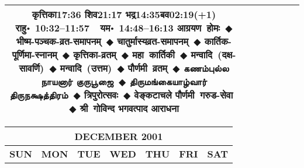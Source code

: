 \documentclass[a3paper,12pt,landscape]{article}
\newcommand{\eventsep}{~$\Diamondblack$ }
\newcommand{\To}{\hspace{1pt}\raisebox{0pt}{\tiny\RIGHTarrow}\hspace{1pt}}
\newcommand{\tamil}[1]{%
{\fontspec[Scale=0.9,FakeStretch=0.9]{Noto Sans Tamil} \footnotesize #1}}
\newcommand{\rahuyama}[2]{%
{राहु॰~\textsf{#1}~~यम॰~\textsf{#2}}
}
\begin{document}
\begin{center}
\begin{tabular}{|c|c|c|c|c|c|c|}
{{\mbox{कृत्तिका\To{}\textsf{17:36\hspace{2ex}}}}%
{\mbox{शिव\To{}\textsf{21:17\hspace{2ex}}}}%
{\mbox{भद्र\To{}\textsf{14:35\hspace{2ex}}}\mbox{बव\To{}\textsf{02:19(+1)\hspace{2ex}}}}}%
{\rahuyama{10:32--11:57}{14:48--16:13}}%
{आग्रयण~होमः\eventsep भीष्म-पञ्चक-व्रत-समापनम्\eventsep चातुर्मास्यव्रत-समापनम्\eventsep कार्तिक-पूर्णिमा-स्नानम्\eventsep कृत्तिका-व्रतम्\eventsep महा~कार्तिकी\eventsep मन्वादि~(दक्ष-सावर्णि)\eventsep मन्वादि~(उत्तम)\eventsep पौर्णमी~व्रतम्\eventsep \tamil{கணம்புல்ல நாயனார் குருபூஜை}\eventsep \tamil{திருமங்கையாழ்வார் திருநக்ஷத்திரம்}\eventsep त्रिपुरोत्सवः\eventsep वेङ्कटाचले पौर्णमी~गरुड-सेवा\eventsep श्री~गोविन्द भगवत्पाद आराधना}
&
\\ \hline
\end{tabular}



\begin{tabular}{|c|c|c|c|c|c|c|}
\multicolumn{7}{c}{\Large \bfseries \sffamily DECEMBER 2001}\\[3mm]
\hline
\textbf{\textsf{SUN}} & \textbf{\textsf{MON}} & \textbf{\textsf{TUE}} & \textbf{\textsf{WED}} & \textbf{\textsf{THU}} & \textbf{\textsf{FRI}} & \textbf{\textsf{SAT}} \\ \hline


\end{tabular}
\end{center}
\end{document}
